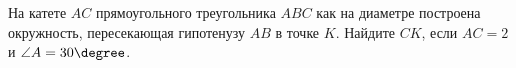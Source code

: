 \begin{ex}
	\begin{condition}
		На катете \( AC  \) прямоугольного треугольника \( ABC  \) как на диаметре построена окружность, пересекающая гипотенузу \( AB  \) в точке \( K \). Найдите \( CK \), если \( AC = 2  \) и \( \angle A = 30\degree \).
	\end{condition}
\end{ex}